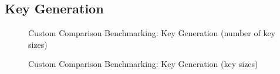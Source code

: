 \documentclass[]{final_report}
\begin{document}
\subsection{Key Generation}
\begin{figure}[H]
    \centering %
    
    \begin{minipage}{0.495\textwidth}
        \centering
       \caption{Custom Comparison Benchmarking: Key Generation (number of key sizes)}
        \label{fig:image1}
    \end{minipage}
    \hfill %
    \begin{minipage}{0.495\textwidth}
        \centering
       \caption{Custom Comparison Benchmarking: Key Generation (key sizes)}
        \label{fig:image2}
    \end{minipage}
\end{figure}
\end{document}
